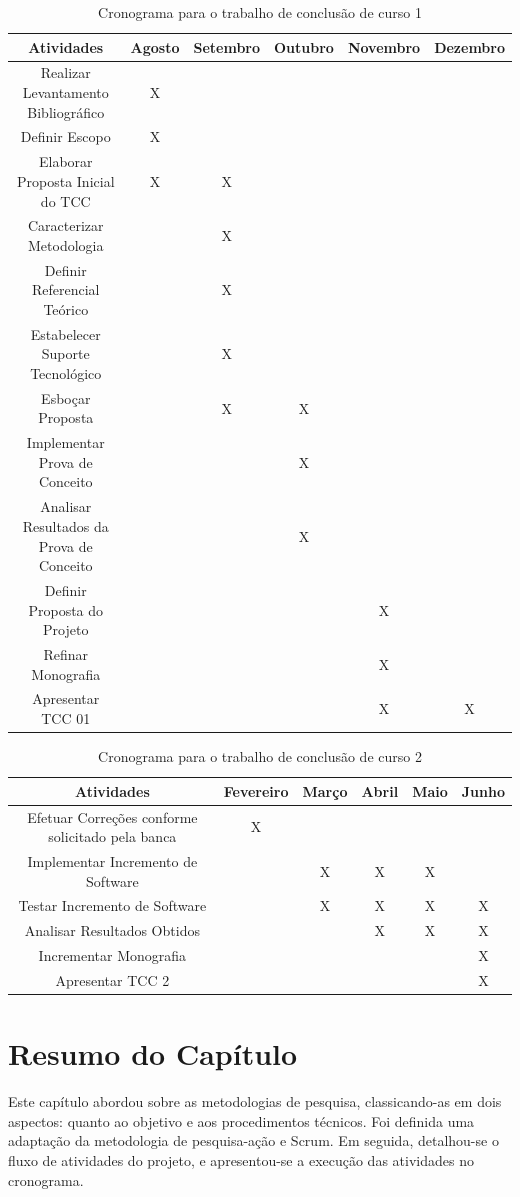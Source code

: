 \begin{table}[h]
  \tiny
  \centering
  \caption{Cronograma para o trabalho de conclusão de curso 1}
  \label{cronograma-tcc-1}
  \begin{tabular}{| c | c | c | c | c | c |}
    \hline
    Atividades & Agosto & Setembro & Outubro & Novembro & Dezembro \\ \hline
    Realizar Levantamento Bibliográfico & X &  &  &  &  \\
    Definir Escopo & X &  &  &  &  \\
    Elaborar Proposta Inicial do TCC & X & X &  &  &  \\
    Caracterizar Metodologia &  & X &  &  &  \\
    Definir Referencial Teórico &  & X &  &  &  \\
    Estabelecer Suporte Tecnológico &  & X &  &  &  \\
    Esboçar Proposta &  & X & X &  &  \\
    Implementar Prova de Conceito &  &  & X &  &  \\
    Analisar Resultados da Prova de Conceito &  &  & X &  &  \\
    Definir Proposta do Projeto &  &  &  & X &  \\
    Refinar Monografia &  &  &  & X &  \\
    Apresentar TCC 01 &  &  &  & X & X \\ \hline
  \end{tabular}
\end{table}
  
\begin{table}[h]
  \tiny
  \centering
  \caption{Cronograma para o trabalho de conclusão de curso 2}
  \label{cronograma-tcc-2}
  \begin{tabular}{| c | c | c | c | c | c |}
  \hline
    Atividades & Fevereiro & Março & Abril & Maio & Junho \\ \hline
    Efetuar Correções conforme solicitado pela banca & X &  &  &  &  \\
    Implementar Incremento de Software &  & X & X & X &  \\
    Testar Incremento de Software &  & X & X & X & X \\
    Analisar Resultados Obtidos &  &  & X & X & X \\
    Incrementar Monografia &  &  &  &  & X \\
    Apresentar TCC 2 &  &  &  &  & X \\ \hline
  \end{tabular}
\end{table}
  
  \section{Resumo do Capítulo}
  Este capítulo abordou sobre as metodologias de pesquisa, classicando-as em dois aspectos: quanto ao objetivo e aos procedimentos técnicos. Foi definida uma adaptação da metodologia de pesquisa-ação e Scrum. Em seguida, detalhou-se o fluxo de atividades do projeto, e apresentou-se a execução das atividades no cronograma.